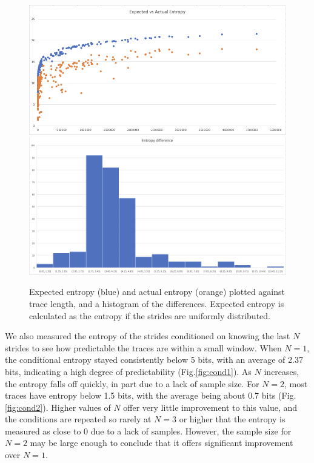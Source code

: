 \begin{figure}[ht]
    \centering
    \includegraphics{expected entropy.png}
    \includegraphics[scale=0.8]{entropy diff.png}
    \caption{Expected entropy (blue) and actual entropy (orange) plotted against trace length, and a histogram of the differences.  Expected entropy is calculated as the entropy if the strides are uniformly distributed.}
    \label{fig:expected}
\end{figure}
\newpage

We also measured the entropy of the strides conditioned on knowing the last $N$ strides to see how predictable the traces are within a small window.  When $N = 1$, the conditional entropy stayed consistently below 5 bits, with an average of 2.37 bits, indicating a high degree of predictability (Fig.\ref{fig:cond1}).  As $N$ increases, the entropy falls off quickly, in part due to a lack of sample size.  For $N = 2$, most traces have entropy below 1.5 bits, with the average being about 0.7 bits (Fig.\ref{fig:cond2}).  Higher values of $N$ offer very little improvement to this value, and the conditions are repeated so rarely at $N = 3$ or higher that the entropy is measured as close to 0 due to a lack of samples.  However, the sample size for $N = 2$ may be large enough to conclude that it offers significant improvement over $N = 1$.

